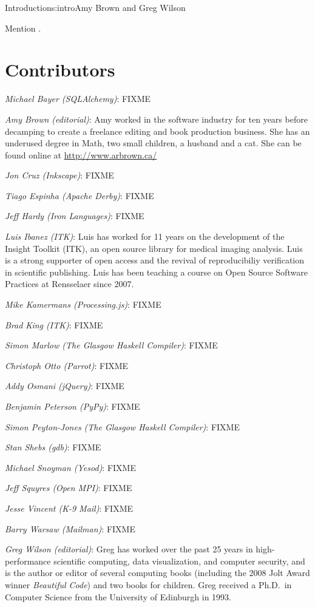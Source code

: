 \begin{aosachapter}{Introduction}{s:intro}{Amy Brown and Greg Wilson}

Mention \cite{b:aosa1}.

\section*{Contributors}

\emph{Michael Bayer (SQLAlchemy)}: FIXME

\emph{Amy Brown (editorial)}: Amy worked in the software industry for
ten years before decamping to create a freelance editing and book production
business. She has an underused degree in Math, two small children, a
husband and a cat. She can be found online at \url{http://www.arbrown.ca/}

\emph{Jon Cruz (Inkscape)}: FIXME

\emph{Tiago Espinha (Apache Derby)}: FIXME

\emph{Jeff Hardy (Iron Languages)}: FIXME

\emph{Luis Ibanez (ITK)}: Luis has worked for 11 years on the development of
the Insight Toolkit (ITK), an open source library for medical imaging analysis.
Luis is a strong supporter of open access and the revival of reproducibiliy
verification in scientific publishing. Luis has been teaching a course on Open
Source Software Practices at Rensselaer since 2007.

\emph{Mike Kamermans (Processing.js)}: FIXME

\emph{Brad King (ITK)}: FIXME

\emph{Simon Marlow (The Glasgow Haskell Compiler)}: FIXME

\emph{Christoph Otto (Parrot)}: FIXME

\emph{Addy Osmani (jQuery)}: FIXME

\emph{Benjamin Peterson (PyPy)}: FIXME

\emph{Simon Peyton-Jones (The Glasgow Haskell Compiler)}: FIXME

\emph{Stan Shebs (gdb)}: FIXME

\emph{Michael Snoyman (Yesod)}: FIXME

\emph{Jeff Squyres (Open MPI)}: FIXME

\emph{Jesse Vincent (K-9 Mail)}: FIXME

\emph{Barry Warsaw (Mailman)}: FIXME

\emph{Greg Wilson (editorial)}: Greg has worked over the past 25 years
in high-performance scientific computing, data visualization, and
computer security, and is the author or editor of several computing
books (including the 2008 Jolt Award winner \emph{Beautiful Code}) and
two books for children.  Greg received a Ph.D.\ in Computer Science
from the University of Edinburgh in 1993.


\end{aosachapter}
